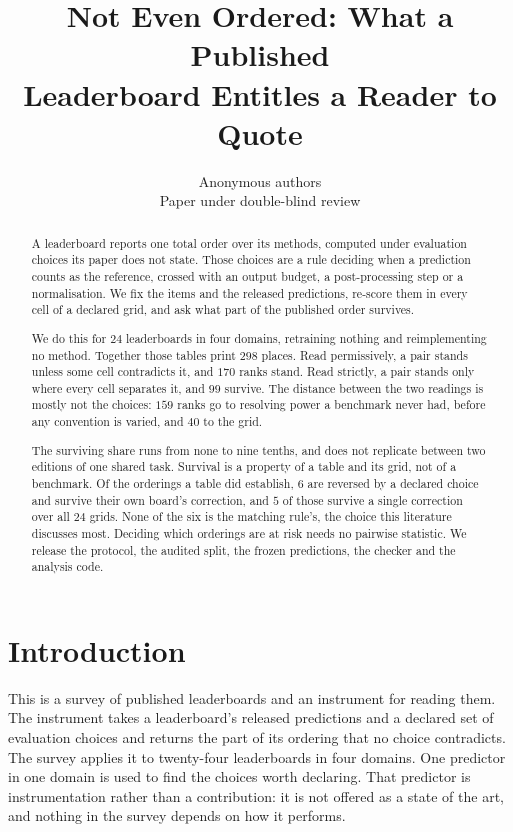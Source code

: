 \documentclass{article}
\title{Not Even Ordered: What a Published\\
Leaderboard Entitles a Reader to Quote}
\author{Anonymous authors \\ Paper under double-blind review}
\begin{document}
\maketitle

\begin{abstract}
A leaderboard reports one total order over its methods, computed under evaluation choices its paper
does not state. Those choices are a rule deciding when a prediction counts as the reference, crossed
with an output budget, a post-processing step or a normalisation. We fix the items and the released
predictions, re-score them in every cell of a declared grid, and ask what part of the published order
survives.

We do this for $24$ leaderboards in four domains, retraining nothing and reimplementing no method.
Together those tables print $298$ places. Read permissively, a pair stands unless some cell
contradicts it, and $170$ ranks stand. Read strictly, a pair stands only where every cell separates
it, and $99$ survive. The distance between the two readings is mostly not the choices: $159$ ranks
go to resolving power a benchmark never had, before any convention is varied, and $40$ to the grid.

The surviving share runs from none to nine tenths, and does not replicate between two editions of one
shared task. Survival is a property of a table and its grid, not of a benchmark. Of the orderings a
table did establish, $6$ are reversed by a declared choice and survive their own board's correction,
and $5$ of those survive a single correction over all $24$ grids. None of the six is the matching
rule's, the choice this literature discusses most. Deciding which orderings are at risk needs no
pairwise statistic. We release the protocol, the audited split, the frozen predictions, the checker
and the analysis code.
\end{abstract}

\section{Introduction}
\label{sec:intro}

This is a survey of published leaderboards and an instrument for reading them. The instrument
takes a leaderboard's released predictions and a declared set of evaluation choices and returns the
part of its ordering that no choice contradicts. The survey applies it to twenty-four leaderboards
in four domains. One predictor in one domain is used to find the choices worth declaring. That
predictor is instrumentation rather than a contribution: it is not offered as a state of the art,
and nothing in the survey depends on how it performs.
\end{document}
